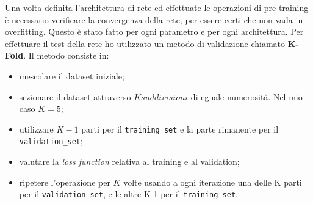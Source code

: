 \documentclass[12pt,a4paper,final]{book}
\begin{document}
Una volta definita l'architettura di rete ed effettuate le operazioni di pre-training è necessario verificare la convergenza della rete, per essere certi che non vada in overfitting. Questo è stato fatto per ogni parametro e per ogni architettura.
Per effettuare il test della rete ho utilizzato un metodo di validazione chiamato \textbf{K-Fold}. Il metodo consiste in:
\begin{itemize}
	\item mescolare il dataset iniziale;
	\item sezionare il dataset attraverso $K suddivisioni$ di eguale numerosità. Nel mio caso $K=5$;
	\item utilizzare $K-1$ parti per il \texttt{training\_set} e la parte rimanente per il \texttt{validation\_set};
	\item valutare la \textit{loss function} relativa al training e al validation;
	\item ripetere l'operazione per $K$ volte usando a ogni iterazione una delle K parti per il \texttt{validation\_set}, e le altre K-1 per il \texttt{training\_set}.
\end{itemize}
\end{document}
